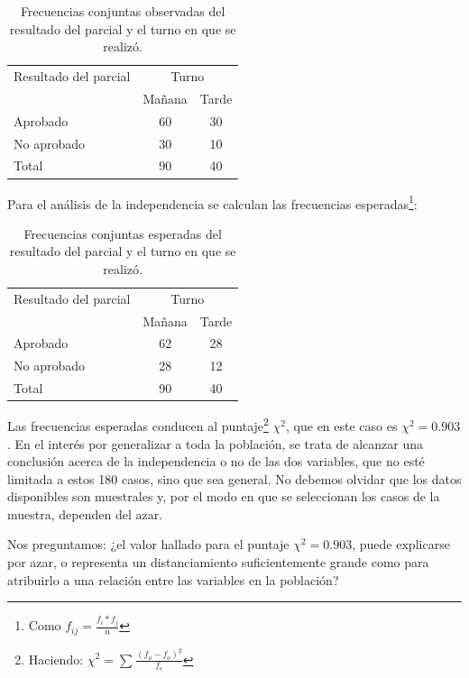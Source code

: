 \documentclass[]{book}
\let\rmarkdownfootnote\footnote%
\def\footnote{\protect\rmarkdownfootnote}
\begin{document}
\begin{table}

\caption{\label{tab:unnamed-chunk-449}Frecuencias conjuntas observadas del resultado del parcial y el turno en que se realizó.}
\centering
\begin{tabular}[t]{lcc}
\toprule
\multicolumn{1}{c}{Resultado del parcial} & \multicolumn{2}{c}{Turno} \\
\cmidrule(l{3pt}r{3pt}){1-1} \cmidrule(l{3pt}r{3pt}){2-3}
 & Mañana & Tarde\\
\midrule
\rowcolor{gray!6}  Aprobado & 60 & 30\\
No aprobado & 30 & 10\\
\rowcolor{gray!6}  Total & 90 & 40\\
\bottomrule
\end{tabular}
\end{table}

Para el análisis de la independencia se calculan las frecuencias
esperadas\footnote{Como \(f_{ij} = \frac{f_{i}*f_{j}}{n}\)}:

\begin{table}

\caption{\label{tab:unnamed-chunk-450}Frecuencias conjuntas esperadas del resultado del parcial y el turno en que se realizó.}
\centering
\begin{tabular}[t]{lcc}
\toprule
\multicolumn{1}{c}{Resultado del parcial} & \multicolumn{2}{c}{Turno} \\
\cmidrule(l{3pt}r{3pt}){1-1} \cmidrule(l{3pt}r{3pt}){2-3}
 & Mañana & Tarde\\
\midrule
\rowcolor{gray!6}  Aprobado & 62 & 28\\
No aprobado & 28 & 12\\
\rowcolor{gray!6}  Total & 90 & 40\\
\bottomrule
\end{tabular}
\end{table}

Las frecuencias esperadas conducen al puntaje\footnote{Haciendo: \(\chi^{2} = \sum_{}^{}\frac{( f_{o} - f_{o} )^{2}}{f_{e}}\)} \(\chi^{2}\), que en
este caso es \(\chi^{2} = 0.903\). En el interés por generalizar a toda la
población, se trata de alcanzar una conclusión acerca de la
independencia o no de las dos variables, que no esté limitada a estos
180 casos, sino que sea general. No debemos olvidar que los datos
disponibles son muestrales y, por el modo en que se seleccionan los
casos de la muestra, dependen del azar.

Nos preguntamos: ¿el valor hallado para el puntaje \(\chi^{2} = 0.903\),
puede explicarse por azar, o representa un distanciamiento
suficientemente grande como para atribuirlo a una relación entre las
variables en la población?
\end{document}
